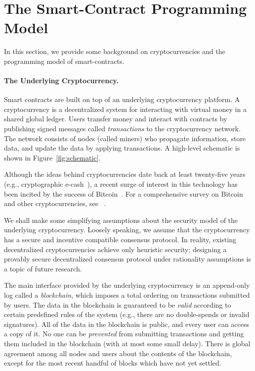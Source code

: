 \documentclass[10pt,twocolumn,letterpaper]{article}
\begin{document}

\section{The Smart-Contract Programming Model}

In this section, we provide some background on cryptocurrencies and the programming model of smart-contracts.

\paragraph{The Underlying Cryptocurrency.}
Smart contracts are built on top of an underlying cryptocurrency platform. A cryptocurrency is a decentralized system for interacting with virtual money in a shared global ledger. Users transfer money and interact with contracts by publishing signed messages called \emph{transactions} to the cryptocurrency network. The network consists of nodes (called miners) who propagate information, store data, and update the data by applying transactions. A high-level schematic is shown in Figure~\ref{fig:schematic}.

Although the ideas behind cryptocurrencies date back at least twenty-five years (e.g., cryptographic e-cash~\cite{chaum-ecash}), a recent surge of interest in this technology has been incited by the success of Bitcoin~\cite{bitcoin}. For a comprehensive survey on Bitcoin and other cryptocurrencies, see ~\cite{researchperspectives,bittertobetter}.

We shall make some simplifying assumptions 
about the security model of the underlying cryptocurrency.
Loosely speaking, we assume that the
cryptocurrency has a secure and incentive compatible
consensus protocol. 
In reality, existing decentralized cryptocurrencies
achieve only heuristic security; designing a provably  
secure decentralized consensus protocol under
rationality assumptions is a topic of 
future research.

The main interface provided by the underlying cryptocurrency is an append-only log called a \emph{blockchain}, which imposes a total ordering on transactions submitted by users. The data in the blockchain is guaranteed to be \emph{valid} according to certain predefined rules of the system (e.g., there are no double-spends or invalid signatures). All of the data in the blockchain is public, and every user can access a copy of it. No one can be \emph{prevented} from submitting transactions and getting them included in the blockchain (with at most some small delay). There is global agreement among all nodes and users about the contents of the blockchain,  except for the most recent handful of blocks which have not yet settled.
\end{document}
